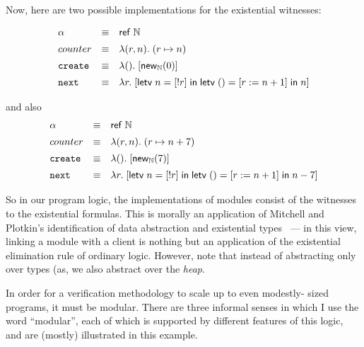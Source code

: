 Now, here are two possible implementations for the existential witnesses:

\begin{displaymath}
\begin{array}{lcl}
\alpha & \equiv & \mathsf{ref}\;\mathbb{N} \\[0.5em]
counter & \equiv & \lambda (r, n).\; (r \mapsto n) \\[0.5em]
\mathtt{create} & \equiv & \lambda ().\; [\mathsf{new}_{\mathbb{N}}(0)] \\[0.5em]
\mathtt{next}  & \equiv & \lambda r.\; [\mathsf{letv}\;n = [!r]\;\mathsf{in}\;
                                        \mathsf{letv}\;() = [r := n + 1]\;\mathsf{in}\;n] \\
\end{array}
\end{displaymath}

and also                                        
\begin{displaymath}
\begin{array}{lcl}
\alpha & \equiv & \mathsf{ref}\;\mathbb{N} \\[0.5em]
counter & \equiv & \lambda (r, n).\; (r \mapsto n + 7) \\[0.5em]
\mathtt{create} & \equiv & \lambda ().\; [\mathsf{new}_{\mathbb{N}}(7)] \\[0.5em]
\mathtt{next}  & \equiv & \lambda r.\; [\mathsf{letv}\;n = [!r]\;\mathsf{in}\;
                                        \mathsf{letv}\;() = [r := n + 1]\;\mathsf{in}\;n - 7] \\
\end{array}
\end{displaymath}

So in our program logic, the implementations of modules consist of the
witnesses to the existential formulas. This is morally an application
of Mitchell and Plotkin's identification of data abstraction and
existential types~\cite{mitchell-plotkin} --- in this view, linking a
module with a client is nothing but an application of the existential
elimination rule of ordinary logic.  However, note that instead of
abstracting only over types (as, we also abstract over the \emph{heap}.

In order for a verification methodology to scale up to even modestly-
sized programs, it must be modular. There are three informal senses in
which I use the word ``modular'', each of which is supported by
different features of this logic, and are (mostly) illustrated in this
example. 

